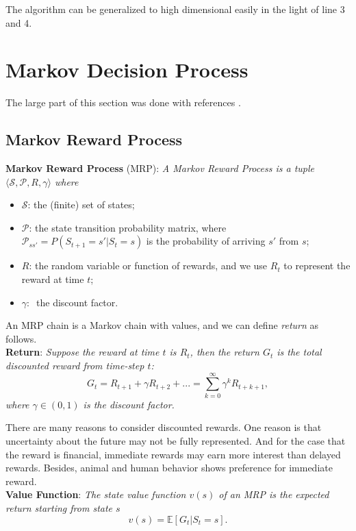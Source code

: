 \documentclass{progartcn}
\begin{document}
        The algorithm can be generalized to high dimensional easily in the light of line 3 and 4.

\pagebreak

\section{Markov Decision Process}

	The large part of this section was done with references \cite{si252,introRL,ucl_rl,sutton2018reinforcement}.\\

	\subsection{Markov Reward Process}

		\textbf{Markov Reward Process} (MRP): \textit{A Markov Reward Process is a tuple $\langle \mathcal{S,P}, R,\gamma\rangle$ where}
		\begin{itemize}[noitemsep,topsep=0pt]
			\item$\mathcal{S}$: the (finite) set of states;
			\item$\mathcal{P}$: the state transition probability matrix, where $\mathcal{P}_{ss'}=P(S_{t+1}=s'|S_t=s)$ is the probability of arriving $s'$ from $s$;
			\item$R$: the random variable or function of rewards, and we use $R_t$ to represent the reward at time $t$;
			\item$\gamma:\ $ the discount factor.
		\end{itemize}

		An MRP chain is a Markov chain with values, and we can define \textit{return} as follows.\\

		\textbf{Return}: \textit{Suppose the reward at time $t$ is $R_t$, then the return $G_t$ is the total discounted reward from time-step $t$:}
		\[G_t=R_{t+1}+\gamma R_{t+2}+...=\sum_{k=0}^\infty \gamma^kR_{t+k+1},\]
		\textit{where $\gamma\in(0,1)$ is the discount factor.}

		There are many reasons to consider discounted rewards. One reason is that uncertainty about the future may not be fully represented. And for the case that the reward is financial, immediate rewards may earn more interest than delayed rewards. Besides, animal and human behavior shows preference for immediate reward.\\

		\textbf{Value Function}: \textit{The state value function $v(s)$ of an MRP is the expected return starting from state $s$}
		\[v(s)=\mathbb{E}[G_t|S_t=s].\]\
\end{document}

